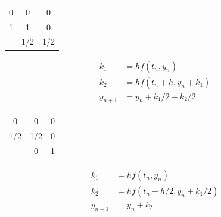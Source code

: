 \documentclass[hidelinks,notitlepage]{book}
\begin{document}
\begin{center}
\begin{minipage}{2in}
	\begin{center}
	\begin{tabular}{c|cc}
		0 & 0 & 0 \\
		1 & 1 & 0 \\
		\hline
		 & 1/2 & 1/2 \\
	\end{tabular}
	\end{center}
	\begin{align}
		\nonumber
		k_1 &= h f(t_n, y_n) \\
		\nonumber
		k_2 &= h f(t_n+h, y_n + k_1) \\
		\nonumber
		y_{n+1} &= y_n + k_1/2 + k_2/2
	\end{align}
	\label{tab:Heun}
\end{minipage}
\begin{minipage}{2in}
	\begin{center}
	\begin{tabular}{c|cc}
		0 & 0 & 0 \\
		1/2 & 1/2 & 0 \\
		\hline
		& 0 & 1 \\
	\end{tabular}    
	\end{center}
	\begin{align}
		\nonumber
		k_1 &= h f(t_n, y_n) \\
		\nonumber
		k_2 &= h f(t_n+h/2, y_n + k_1/2) \\
		\nonumber
		y_{n+1} &= y_n + k_2
	\end{align}
	\label{tab:Midpoint}
\end{minipage}
\end{center}
\end{document}
